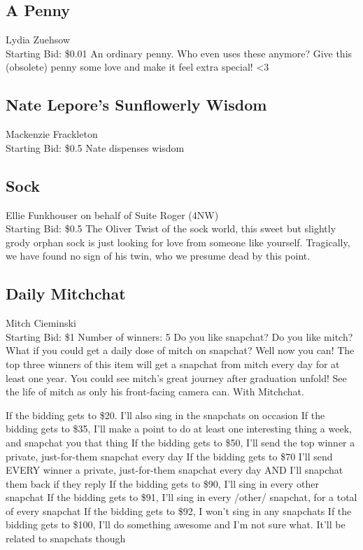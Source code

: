 \documentclass[11pt]{article}
\begin{document}
\subsection{A Penny}
Lydia Zuehsow
\\
Starting Bid: \$0.01
\newline
An ordinary penny. Who even uses these anymore?
Give this (obsolete) penny some love and make it feel extra special! \textless 3
\subsection{Nate Lepore's Sunflowerly Wisdom}
Mackenzie Frackleton 
\\
Starting Bid: \$0.5
\newline
Nate dispenses wisdom
\subsection{Sock}
Ellie Funkhouser on behalf of Suite Roger (4NW)
\\
Starting Bid: \$0.5
\newline
The Oliver Twist of the sock world, this sweet but slightly grody orphan sock is just looking for love from someone like yourself. Tragically, we have found no sign of his twin, who we presume dead by this point.
\subsection{Daily Mitchchat}
Mitch Cieminski
\\
Starting Bid: \$1
\newline
Number of winners: 5
\newline
Do you like snapchat? Do you like mitch? What if you could get a daily dose of mitch on snapchat? Well now you can! The top three winners of this item will get a snapchat from mitch every day for at least one year. You could see mitch's great journey after graduation unfold! See the life of mitch as only his front-facing camera can. With Mitchchat.

If the bidding gets to \$20. I'll also sing in the snapchats on occasion
If the bidding gets to \$35, I'll make a point to do at least one interesting thing a week, and snapchat you that thing
If the bidding gets to \$50, I'll send the top winner a private, just-for-them snapchat every day
If the bidding gets to \$70 I'll send EVERY winner a private, just-for-them snapchat every day AND I'll snapchat them back if they reply
If the bidding gets to \$90, I'll sing in every other snapchat
If the bidding gets to \$91, I'll sing in every /other/ snapchat, for a total of every snapchat
If the bidding gets to \$92, I won't sing in any snapchats
If the bidding gets to \$100, I'll do something awesome and I'm not sure what. It'll be related to snapchats though
\end{document}

